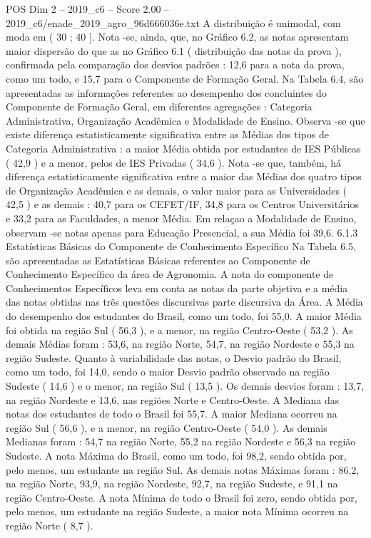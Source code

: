 \begin{textsample}{POS Dim 2 – 2019\_c6 – Score 2.00 – 2019\_c6/enade\_2019\_agro\_96d666036e.txt}
A distribuição é unimodal, com moda em ( 30 ; 40 ].
Nota -se, ainda, que, no Gráfico 6.2, as notas apresentam maior dispersão do que as no Gráfico 6.1 ( distribuição das notas da prova ), confirmada pela comparação dos desvios padrões : 12,6 para a nota da prova, como um todo, e 15,7 para o Componente de Formação Geral.
Na Tabela 6.4, são apresentadas as informações referentes ao desempenho dos concluintes do Componente de Formação Geral, em diferentes agregações : Categoria Administrativa, Organização Acadêmica e Modalidade de Ensino.
Observa -se que existe diferença estatisticamente significativa entre as Médias dos tipos de Categoria Administrativa : a maior Média obtida por estudantes de IES Públicas ( 42,9 ) e a menor, pelos de IES Privadas ( 34,6 ).
Nota -se que, também, há diferença estatisticamente significativa entre a maior das Médias dos quatro tipos de Organização Acadêmica e as demais, o valor maior para as Universidades ( 42,5 ) e as demais : 40,7 para os CEFET/IF, 34,8 para os Centros Universitários e 33,2 para as Faculdades, a menor Média.
Em relaçao a Modalidade de Ensino, observam -se notas apenas para Educação Presencial, a sua Média foi 39,6. 6.1.3 Estatísticas Básicas do Componente de Conhecimento Específico Na Tabela 6.5, são apresentadas as Estatísticas Básicas referentes ao Componente de Conhecimento Específico da área de Agronomia.
A nota do componente de Conhecimentos Específicos leva em conta as notas da parte objetiva e a média das notas obtidas nas três questões discursivas parte discursiva da Área.
A Média do desempenho dos estudantes do Brasil, como um todo, foi 55,0.
A maior Média foi obtida na região Sul ( 56,3 ), e a menor, na região Centro-Oeste ( 53,2 ).
As demais Médias foram : 53,6, na região Norte, 54,7, na região Nordeste e 55,3 na região Sudeste.
Quanto à variabilidade das notas, o Desvio padrão do Brasil, como um todo, foi 14,0, sendo o maior Desvio padrão observado na região Sudeste ( 14,6 ) e o menor, na região Sul ( 13,5 ).
Os demais desvios foram : 13,7, na região Nordeste e 13,6, nas regiões Norte e Centro-Oeste.
A Mediana das notas dos estudantes de todo o Brasil foi 55,7.
A maior Mediana ocorreu na região Sul ( 56,6 ), e a menor, na região Centro-Oeste ( 54,0 ).
As demais Medianas foram : 54,7 na região Norte, 55,2 na região Nordeste e 56,3 na região Sudeste.
A nota Máxima do Brasil, como um todo, foi 98,2, sendo obtida por, pelo menos, um estudante na região Sul.
As demais notas Máximas foram : 86,2, na região Norte, 93,9, na região Nordeste, 92,7, na região Sudeste, e 91,1 na região Centro-Oeste.
A nota Mínima de todo o Brasil foi zero, sendo obtida por, pelo menos, um estudante na região Sudeste, a maior nota Mínima ocorreu na região Norte ( 8,7 ).

\end{textsample}
